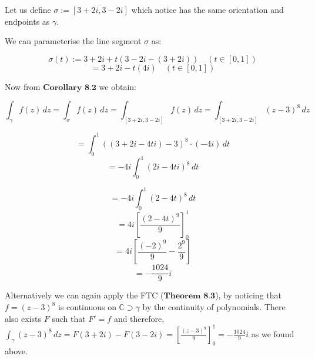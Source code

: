 \documentclass[12pt]{article}
\begin{document}
\begin{enumerate}[label=\textbf{(\roman*)}]

Let us define \(\sigma := \overline{\left[3+2i,3-2i\right]}\) which notice has the same orientation and endpoints as \(\gamma\).

We can parameterise the line segment \(\sigma\) as:

\[
\sigma(t) := 3+2i + t\left(3-2i - \left(3+2i\right)\right) \quad \left(t\in\left[0,1\right]\right)\]
\[
= 3+2i - t\left(4i\right) \quad \left(t\in\left[0,1\right]\right)
\]

Now from \(\textbf{Corollary 8.2}\) we obtain:

\[
\int_{\gamma} f(z)\,dz = \int_{\sigma} f(z) \, dz = \int_{\overline{\left[3+2i,3-2i\right]}} f(z) \, dz = \int_{\overline{\left[3+2i,3-2i\right]}} \left(z-3\right)^8 \, dz  
\]

\[
= \int_{0}^{1} \left(\left(3+2i -4ti\right) -3 \right)^8 \cdot \left(-4i\right) \, dt 
\]
\[
= -4i \int_{0}^{1} \left(2i-4ti\right)^8 \, dt
\]

\[
= -4i \int_{0}^{1} \left(2-4t\right)^8 \, dt
\]
\[
= 4i \left[\frac{\left(2-4t\right)^9}{9}\right]_{0}^{1}
\]
\[
= 4i \left[\frac{\left(-2\right)^9}{9} - \frac{2^9}{9}\right]
\]
\[
= - \frac{1024}{9}i
\] 

Alternatively we can again apply the FTC (\(\textbf{Theorem 8.3}\)), by noticing that \(f = \left(z-3\right)^8\) is continuous on \(\mathbb{C} \supset \gamma\) by the continuity of polynomials. There also exists \(F\) such that  \(F' = f\) and therefore, \(\int_{\gamma} \left(z-3\right)^8 \, dz = F(3+2i) - F(3-2i) = \left[\frac{\left(z-3\right)^9}{9}\right]_{0}^{1} = -\frac{1024}{9}i \) as we found above.


\end{enumerate}
\end{document}
